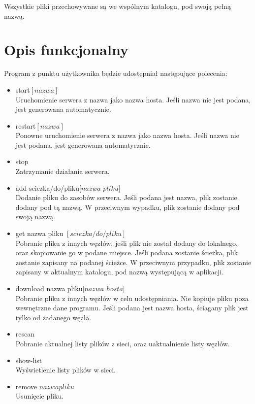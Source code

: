 \documentclass[10pt,a4paper]{article}
\begin{document}
Wszystkie pliki przechowywane są we wspólnym katalogu, pod swoją pełną nazwą.



\section{Opis funkcjonalny}
Program z punktu użytkownika będzie udostępniał następujące polecenia:\\
\begin{itemize}
\item start$[nazwa]$\\
Uruchomienie serwera z nazwa jako nazwa hosta. Jeśli nazwa nie jest podana, jest generowana automatycznie.
\item restart$[nazwa]$\\
Ponowne uruchomienie serwera z nazwa jako nazwa hosta. Jeśli nazwa nie jest podana, jest generowana automatycznie.

\item stop\\
Zatrzymanie działania serwera.

\item add sciezka/do/pliku$[nazwa$ $pliku]$\\
Dodanie pliku do zasobów serwera. Jeśli podana jest nazwa, plik zostanie dodany pod tą nazwą. W przeciwnym wypadku, plik zostanie dodany pod swoją nazwą.

\item get nazwa pliku $[sciezka/do/pliku]$\\
Pobranie pliku z innych węzłów, jeśli plik nie został dodany do lokalnego,
oraz skopiowanie go w podane miejsce. Jeśli podana zostanie ścieżka,
plik zostanie zapisany na podanej ścieżce. W przeciwnym przypadku,
plik zostanie zapisany w aktualnym katalogu, pod nazwą występującą w aplikacji.
\item download nazwa pliku$[nazwa$ $hosta]$\\
Pobranie pliku z innych węzłów w celu udostępniania. Nie kopiuje pliku poza wewnętrzne dane programu. Jeśli podana jest nazwa hosta, ściagany plik jest tylko od żadanego węzła.

\item rescan\\
Pobranie aktualnej listy plików z sieci, oraz uaktualnienie listy węzłów.

\item show-list\\
Wyświetlenie listy plików w sieci.
\item remove $nazwa$$pliku$\\
Usunięcie pliku.
\end{itemize}
\end{document}
